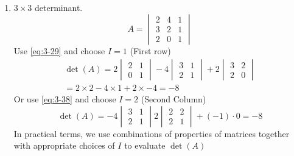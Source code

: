 \documentclass{article}
\numberwithin{equation}{section}
\begin{document}
\begin{eg}
\begin{enumerate}
        \item $3 \times 3$ determinant.
        \[
            A = \begin{vmatrix}
                2 & 4 & 1 \\
                3 & 2 & 1 \\
                2 & 0 & 1
            \end{vmatrix}  
        \]
        Use \eqref{eq:3-29} and choose $I = 1$ (First row)
        \begin{align*}
            \det(A) = 2 \begin{vmatrix}
                2 & 1 \\
                0 & 1
            \end{vmatrix} 
            -4 \begin{vmatrix}
                3 & 1 \\
                2 & 1
            \end{vmatrix}
            + 2 \begin{vmatrix}
                3 & 2 \\
                2 & 0
            \end{vmatrix} \\
            = 2 \times 2 - 4 \times 1 + 2 \times -4 = -8
        \end{align*}
        Or use \eqref{eq:3-38} and choose $I = 2$ (Second Column)
        \[
            \det(A) = -4 \begin{vmatrix}
                3 & 1 \\
                2 & 1
            \end{vmatrix} 
            2 \begin{vmatrix}
                2 & 2 \\
                2 & 1
            \end{vmatrix}
            + (-1) \cdot 0 = -8 
        \]
        In practical terms, we use combinations of properties of matrices together with appropriate choices of $I$ to evaluate $\det(A)$


\end{enumerate}
\end{eg}
\end{document}
